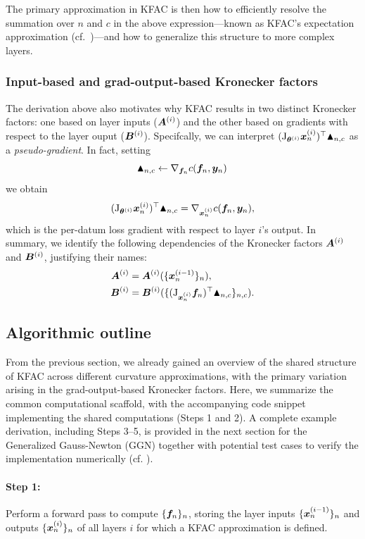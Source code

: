 The primary approximation in KFAC is then how to efficiently resolve the summation over $n$ and $c$ in the above expression---known as KFAC's expectation approximation (cf.~)---and how to generalize this structure to more complex layers.

\subsubsection{Input-based and grad-output-based Kronecker factors}
The derivation above also motivates why KFAC results in two distinct Kronecker factors: one based on layer inputs (${\bm{A}}^{(i)}$) and the other based on gradients with respect to the layer ouput (${\bm{B}}^{(i)}$). Specifcally, we can interpret $(\mathrm{J}_{{\bm{\theta}}^{(i)}} {\bm{x}}_n^{(i)})^{\top} \blacktriangle_{n,c}$ as a \emph{pseudo-gradient}. In fact, setting
$$\blacktriangle_{n,c} \leftarrow \nabla_{{\bm{f}}_n} c({\bm{f}}_n, {\bm{y}}_n)\,$$
we obtain
$$(\mathrm{J}_{{\bm{\theta}}^{(i)}} {\bm{x}}_n^{(i)})^{\top} \blacktriangle_{n,c} = \nabla_{{\bm{x}}_n^{(i)}} c({\bm{f}}_n, {\bm{y}}_n),$$
which is the per-datum loss gradient with respect to layer $i$'s output.
In summary, we identify the following dependencies of the Kronecker factors ${\bm{A}}^{(i)}$ and ${\bm{B}}^{(i)}$, justifying their names:
\begin{align*}
  {\bm{A}}^{(i)} &= {\bm{A}}^{(i)}( \{{\bm{x}}_{n}^{(i-1)}\}_n ),
  \\
  {\bm{B}}^{(i)} &= {\bm{B}}^{(i)}( \{ (\mathrm{J}_{{\bm{x}}_n^{(i)}}{\bm{f}}_{n})^{\top} \blacktriangle_{n,c}\}_{n,c}).
\end{align*}

\subsection{Algorithmic outline}

From the previous section, we already gained an overview of the shared structure of KFAC across different curvature approximations, with the primary variation arising in the grad-output-based Kronecker factors.
Here, we summarize the common computational scaffold, with the accompanying code snippet implementing the shared computations (Steps 1 and 2).
A complete example derivation, including Steps 3–5, is provided in the next section for the Generalized Gauss-Newton (GGN) together with potential test cases to verify the implementation numerically (cf. ).

\paragraph{Step 1:} Perform a forward pass to compute $\{{\bm{f}}_n\}_n $, storing the layer inputs $\{{\bm{x}}_n^{(i-1)} \}_n$ and outputs $\{{\bm{x}}_n^{(i)}\}_n$ of all layers $i$ for which a KFAC approximation is defined.

